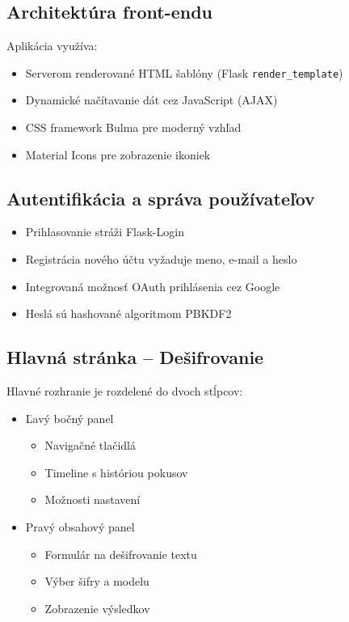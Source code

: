 \documentclass[12pt,a4paper]{article}
\begin{document}
\subsection{Architektúra front-endu}
Aplikácia využíva:
\begin{itemize}
    \item Serverom renderované HTML šablóny (Flask \texttt{render\_template})
    \item Dynamické načítavanie dát cez JavaScript (AJAX)
    \item CSS framework Bulma pre moderný vzhľad
    \item Material Icons pre zobrazenie ikoniek
\end{itemize}

\subsection{Autentifikácia a správa používateľov}
\begin{itemize}
    \item Prihlasovanie stráži Flask-Login
    \item Registrácia nového účtu vyžaduje meno, e-mail a heslo
    \item Integrovaná možnosť OAuth prihlásenia cez Google
    \item Heslá sú hashované algoritmom PBKDF2
\end{itemize}

\subsection{Hlavná stránka -- Dešifrovanie}
Hlavné rozhranie je rozdelené do dvoch stĺpcov:
\begin{itemize}
    \item Ľavý bočný panel
    \begin{itemize}
        \item Navigačné tlačidlá
        \item Timeline s históriou pokusov
        \item Možnosti nastavení
    \end{itemize}
    \item Pravý obsahový panel
    \begin{itemize}
        \item Formulár na dešifrovanie textu
        \item Výber šifry a modelu
        \item Zobrazenie výsledkov
    \end{itemize}
\end{itemize}
\end{document}
